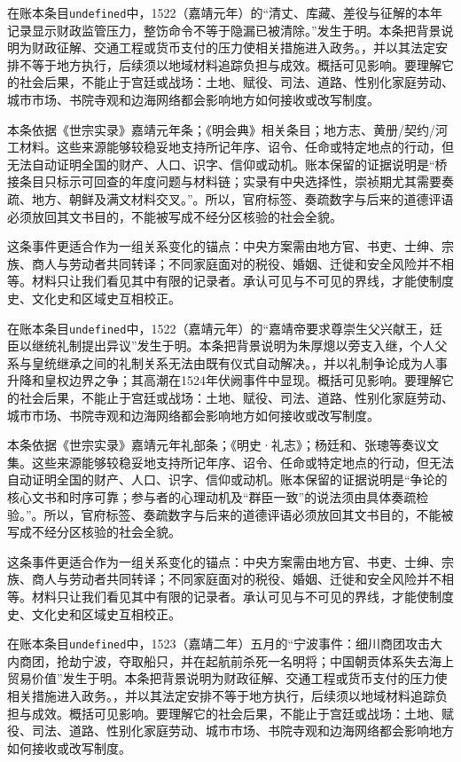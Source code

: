 在账本条目\texttt{undefined}中，1522（嘉靖元年）的“清丈、库藏、差役与征解的本年记录显示财政监管压力，整饬命令不等于隐漏已被清除。”发生于明。本条把背景说明为财政征解、交通工程或货币支付的压力使相关措施进入政务。，并以其法定安排不等于地方执行，后续须以地域材料追踪负担与成效。概括可见影响。要理解它的社会后果，不能止于宫廷或战场：土地、赋役、司法、道路、性别化家庭劳动、城市市场、书院寺观和边海网络都会影响地方如何接收或改写制度。

本条依据《世宗实录》嘉靖元年条；《明会典》相关条目；地方志、黄册/契约/河工材料。这些来源能够较稳妥地支持所记年序、诏令、任命或特定地点的行动，但无法自动证明全国的财产、人口、识字、信仰或动机。账本保留的证据说明是“桥接条目只标示可回查的年度问题与材料链；实录有中央选择性，崇祯期尤其需要奏疏、地方、朝鲜及满文材料交叉。”。所以，官府标签、奏疏数字与后来的道德评语必须放回其文书目的，不能被写成不经分区核验的社会全貌。

这条事件更适合作为一组关系变化的锚点：中央方案需由地方官、书吏、士绅、宗族、商人与劳动者共同转译；不同家庭面对的税役、婚姻、迁徙和安全风险并不相等。材料只让我们看见其中有限的记录者。承认可见与不可见的界线，才能使制度史、文化史和区域史互相校正。

在账本条目\texttt{undefined}中，1522（嘉靖元年）的“嘉靖帝要求尊崇生父兴献王，廷臣以继统礼制提出异议”发生于明。本条把背景说明为朱厚熜以旁支入继，个人父系与皇统继承之间的礼制关系无法由既有仪式自动解决。，并以礼制争论成为人事升降和皇权边界之争；其高潮在1524年伏阙事件中显现。概括可见影响。要理解它的社会后果，不能止于宫廷或战场：土地、赋役、司法、道路、性别化家庭劳动、城市市场、书院寺观和边海网络都会影响地方如何接收或改写制度。

本条依据《世宗实录》嘉靖元年礼部条；《明史·礼志》；杨廷和、张璁等奏议文集。这些来源能够较稳妥地支持所记年序、诏令、任命或特定地点的行动，但无法自动证明全国的财产、人口、识字、信仰或动机。账本保留的证据说明是“争论的核心文书和时序可靠；参与者的心理动机及“群臣一致”的说法须由具体奏疏检验。”。所以，官府标签、奏疏数字与后来的道德评语必须放回其文书目的，不能被写成不经分区核验的社会全貌。

这条事件更适合作为一组关系变化的锚点：中央方案需由地方官、书吏、士绅、宗族、商人与劳动者共同转译；不同家庭面对的税役、婚姻、迁徙和安全风险并不相等。材料只让我们看见其中有限的记录者。承认可见与不可见的界线，才能使制度史、文化史和区域史互相校正。

在账本条目\texttt{undefined}中，1523（嘉靖二年）五月的“宁波事件：细川商团攻击大内商团，抢劫宁波，夺取船只，并在起航前杀死一名明将；中国朝贡体系失去海上贸易价值”发生于明。本条把背景说明为财政征解、交通工程或货币支付的压力使相关措施进入政务。，并以其法定安排不等于地方执行，后续须以地域材料追踪负担与成效。概括可见影响。要理解它的社会后果，不能止于宫廷或战场：土地、赋役、司法、道路、性别化家庭劳动、城市市场、书院寺观和边海网络都会影响地方如何接收或改写制度。

